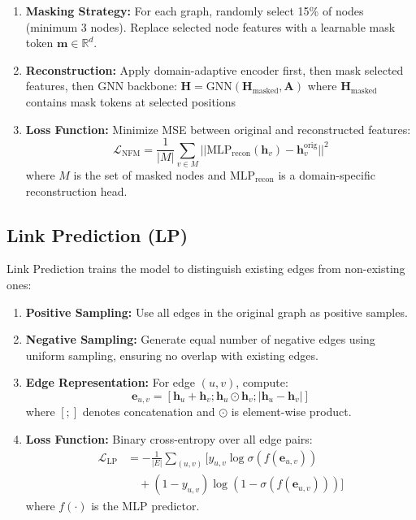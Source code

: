 \documentclass[11pt]{article}
\begin{document}
\begin{enumerate}
\item \textbf{Masking Strategy:} For each graph, randomly select 15\% of nodes (minimum 3 nodes). Replace selected node features with a learnable mask token $\mathbf{m} \in \mathbb{R}^d$.

\item \textbf{Reconstruction:} Apply domain-adaptive encoder first, then mask selected features, then GNN backbone: $\mathbf{H} = \text{GNN}(\mathbf{H}_{\text{masked}}, \mathbf{A})$ where $\mathbf{H}_{\text{masked}}$ contains mask tokens at selected positions

\item \textbf{Loss Function:} Minimize MSE between original and reconstructed features:
\begin{equation*}
\mathcal{L}_{\text{NFM}} = \frac{1}{|M|} \sum_{v \in M} ||\text{MLP}_{\text{recon}}(\mathbf{h}_v) - \mathbf{h}_v^{\text{orig}}||^2
\end{equation*}
where $M$ is the set of masked nodes and $\text{MLP}_{\text{recon}}$ is a domain-specific reconstruction head.
\end{enumerate}

\subsection{Link Prediction (LP)}
\label{sec:lp}

Link Prediction trains the model to distinguish existing edges from non-existing ones:

\begin{enumerate}
\item \textbf{Positive Sampling:} Use all edges in the original graph as positive samples.

\item \textbf{Negative Sampling:} Generate equal number of negative edges using uniform sampling, ensuring no overlap with existing edges.

\item \textbf{Edge Representation:} For edge $(u,v)$, compute:
\begin{equation*}
\mathbf{e}_{u,v} = [\mathbf{h}_u + \mathbf{h}_v; \mathbf{h}_u \odot \mathbf{h}_v; |\mathbf{h}_u - \mathbf{h}_v|]
\end{equation*}
where $[;]$ denotes concatenation and $\odot$ is element-wise product.

\item \textbf{Loss Function:} Binary cross-entropy over all edge pairs:
\begin{align*}
\mathcal{L}_{\text{LP}} &= -\frac{1}{|E|} \sum_{(u,v)} \big[ y_{u,v} \log \sigma(f(\mathbf{e}_{u,v})) \\
&\quad + (1-y_{u,v}) \log(1-\sigma(f(\mathbf{e}_{u,v}))) \big]
\end{align*}
where $f(\cdot)$ is the MLP predictor.
\end{enumerate}
\end{document}
